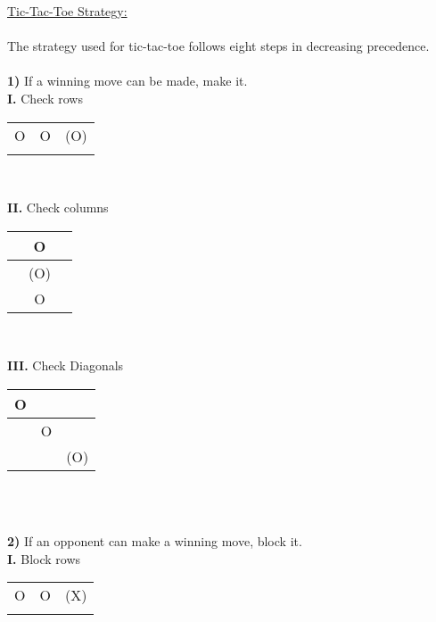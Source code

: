 \documentclass[12pt]{article}
\newcommand\tab[1][3cm]{\hspace*{#1}}
\begin{document}
\vspace*{-10mm}

{\large \noindent
\underline{Tic-Tac-Toe Strategy:}} \\
\\
The strategy used for tic-tac-toe follows eight steps in decreasing precedence. \\
\\
\textbf{1)} If a winning move can be made, make it. \\
\tab\textbf{I.} Check rows \\
\begin{center}
\begin{tabular}{c|c|c}
	  &   &   \\      \hline
	O & O &(O)\\      \hline
	  &   &  
  \end{tabular} \\
\end{center}
\tab\textbf{II.} Check columns \\
\begin{center}
	\begin{tabular}{c|c|c}
		  & O &   \\      \hline
		  &(O)&   \\      \hline
		  & O &  
	  \end{tabular} \\
	\end{center}
\tab\textbf{III.} Check Diagonals \\
\begin{center}
	\begin{tabular}{c|c|c}
		O &   &  \\      \hline
		  & O &  \\      \hline
		  &   &(O)
	  \end{tabular} \\
	\end{center}
~\\
\textbf{2)} If an opponent can make a winning move, block it. \\
\tab\textbf{I.} Block rows \\
\begin{center}
\begin{tabular}{c|c|c}
	  &   &   \\      \hline
	O & O & (X)  \\      \hline
	  &   &  
  \end{tabular} \\
\end{center}
\end{document}
